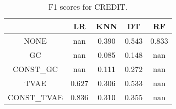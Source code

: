 \begin{table}
\caption{F1 scores for CREDIT.}
\label{tab:f1-CREDIT}
\begin{tabular}{ccccc}
\toprule
 & LR & KNN & DT & RF \\
\midrule
NONE & nan & 0.390 & 0.543 & 0.833 \\
GC & nan & 0.085 & 0.148 & nan \\
CONST\_GC & nan & 0.111 & 0.272 & nan \\
TVAE & 0.627 & 0.306 & 0.533 & nan \\
CONST\_TVAE & 0.836 & 0.310 & 0.355 & nan \\
\bottomrule
\end{tabular}
\end{table}

